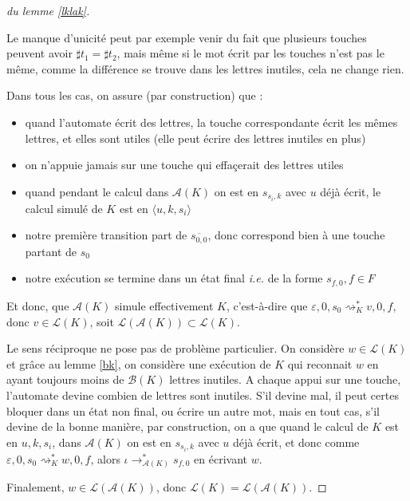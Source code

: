 \documentclass[12pt, a4paper]{article}
\renewcommand{\L}{\mathcal{L}}
\newcommand{\A}{\mathcal{A}}
\begin{document}
\begin{proof}[du lemme \ref{lklak}]
\begin{enumerate}
       \end{enumerate}
       Le manque d'unicité peut par exemple venir du fait que plusieurs touches peuvent avoir $\sharp t_1 = \sharp t_2$, mais même si le mot écrit par les touches n'est pas le même, comme la différence se trouve dans les lettres inutiles, cela ne change rien.

       Dans tous les cas, on assure (par construction) que :
       \begin{itemize}
        \item quand l'automate écrit des lettres, la touche correspondante écrit les mêmes lettres, et elles sont utiles (elle peut écrire des lettres inutiles en plus)
        \item on n'appuie jamais sur une touche qui effaçerait des lettres utiles 
        \item quand pendant le calcul dans $\A(K)$ on est en $s_{s_i,k}$ avec $u$ déjà écrit, le calcul simulé de $K$ est en $\langle u,k,s_i\rangle$
        \item notre première transition part de $\overline{s_{0,0}}$, donc correspond bien à une touche partant de $s_0$ 
        \item notre exécution se termine dans un état final \textit{i.e.} de la forme $s_{f,0}, f \in F$
       \end{itemize} 
       Et donc, que $\A(K)$ simule effectivement $K$, c'est-à-dire que $\varepsilon,0,s_0 \rightsquigarrow^*_K v,0,f$, donc $v \in \L(K)$, soit $\L(\A(K)) \subset \L(K)$.

       Le sens réciproque ne pose pas de problème particulier. On considère $w \in \L(K)$ et grâce au lemme \ref{bk}, on considère une exécution de $K$ qui reconnait $w$ en ayant toujours moins de $\mathcal{B}(K)$ lettres inutiles.
       A chaque appui sur une touche, l'automate devine combien de lettres sont inutiles. 
       S'il devine mal, il peut certes bloquer dans un état non final, ou écrire un autre mot, mais en tout cas, s'il devine de la bonne manière, par construction, on a que quand le calcul de $K$ est en $u,k,s_i$, dans $\A(K)$ on est en $s_{s_i,k}$ avec $u$ déjà écrit, et donc comme $\varepsilon,0,s_0 \rightsquigarrow^*_K w,0,f$, alors $\iota \rightarrow^*_{\A(K)} s_{f,0}$ en écrivant $w$. 
       
       Finalement, $w \in \L(\A(K))$, donc $\L(K) = \L(\A(K))$.
    \end{proof}

    \clearpage
    \printbibliography
\end{document}
